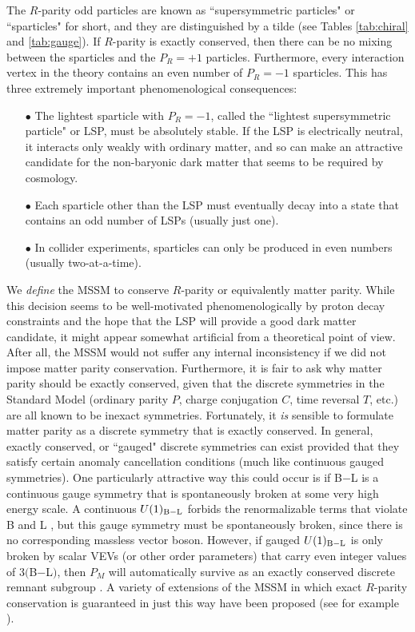 \documentclass[11pt]{article}
\def\Baryon{{\rm B}}
\def\Lepton{{\rm L}}
\begin{document}
The $R$-parity odd particles are known as ``supersymmetric particles" or
``sparticles" for short, and they are distinguished by a tilde (see Tables
\ref{tab:chiral} and \ref{tab:gauge}). 
If $R$-parity is exactly conserved, then there can be no mixing
between the sparticles and the $P_R=+1$ particles. Furthermore, every
interaction vertex in the theory contains an even number of $P_R=-1$
sparticles. This has three extremely important phenomenological
consequences:
\begin{itemize}
\item[$\bullet$] The lightest sparticle with $P_R=-1$, called the
``lightest supersymmetric particle" or LSP, must be absolutely stable. If
the LSP is electrically neutral, it interacts only weakly with ordinary
matter, and so can make an attractive candidate \cite{neutralinodarkmatter} 
for the non-baryonic dark matter that seems to be required by cosmology.
%
\item[$\bullet$] Each sparticle other than the LSP must eventually decay
into a state that contains an odd number of LSPs (usually just one).
%
\item[$\bullet$] In collider experiments, sparticles can only be produced
in even numbers (usually two-at-a-time).
\end{itemize}

We {\it define} the MSSM to conserve $R$-parity or equivalently matter
parity. While this decision seems to be well-motivated phenomenologically
by proton decay constraints and the hope that the LSP will provide a good
dark matter candidate, it might appear somewhat artificial from a
theoretical point of view. After all, the MSSM would not suffer any
internal inconsistency if we did not impose matter parity conservation.
Furthermore, it is fair to ask why matter parity should be exactly
conserved, given that the discrete symmetries in the Standard Model
(ordinary parity $P$, charge conjugation $C$, time reversal $T$, etc.) are
all known to be inexact symmetries. Fortunately, it {\it is} sensible to
formulate matter parity as a discrete symmetry that is exactly conserved.
In general, exactly conserved, or ``gauged" discrete symmetries \cite{KW}
can exist provided that they satisfy certain anomaly cancellation
conditions \cite{discreteanomaly} (much like continuous gauged
symmetries). One particularly attractive way this could occur is if B$-$L
is a continuous gauge symmetry that is spontaneously broken at some
very high energy scale. A continuous $U(1)_{\Baryon-\Lepton}$
forbids the renormalizable terms that violate B and L 
\cite{Rparityoriginone,Rparityorigintwo},
but this gauge symmetry must be spontaneously broken, since there
is no corresponding massless vector boson.
However, if gauged $U(1)_{\Baryon - \Lepton}$ is only broken
by scalar VEVs (or other order parameters) that carry even integer
values of $3($B$-$L$)$, then $P_M$ will automatically survive as an
exactly conserved discrete remnant subgroup \cite{Rparityorigintwo}. 
A variety of extensions of the MSSM in which exact $R$-parity 
conservation is guaranteed in just this way have been proposed
(see for example \cite{Rparityorigintwo,Rparityoriginthree}). 
\end{document}
